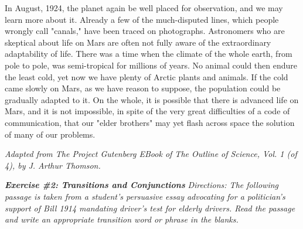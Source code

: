 \begin{spacing}{2}
\begin{linenumbers*}
\indent In August, 1924, the planet again be well placed for observation, and we may learn more about it. Already a few of the much-disputed lines, which people wrongly call "canals," have been traced on photographs. Astronomers who are skeptical about life on Mars are often not fully aware of the extraordinary adaptability of life. There was a time when the climate of the whole earth, from pole to pole, was semi-tropical for millions of years. No animal could then endure the least cold, yet now we have plenty of Arctic plants and animals. If the cold came slowly on Mars, as we have reason to suppose, the population could be gradually adapted to it. On the whole, it is possible that there is advanced life on Mars, and it is not impossible, in spite of the very great difficulties of a code of communication, that our "elder brothers" may yet flash across space the solution of many of our problems.
\end{linenumbers*}

\textit{Adapted from The Project Gutenberg EBook of The Outline of Science, Vol. 1 (of 4), by J. Arthur Thomson.}

\end{spacing}

\bigskip
\textbf{\textit{Exercise \#2: Transitions and Conjunctions}}
\bigskip
\textit{Directions: The following passage is taken from a student's persuasive essay advocating for a politician's support of Bill 1914 mandating driver's test for elderly drivers. Read the passage and write an appropriate transition word or phrase in the blanks.}

